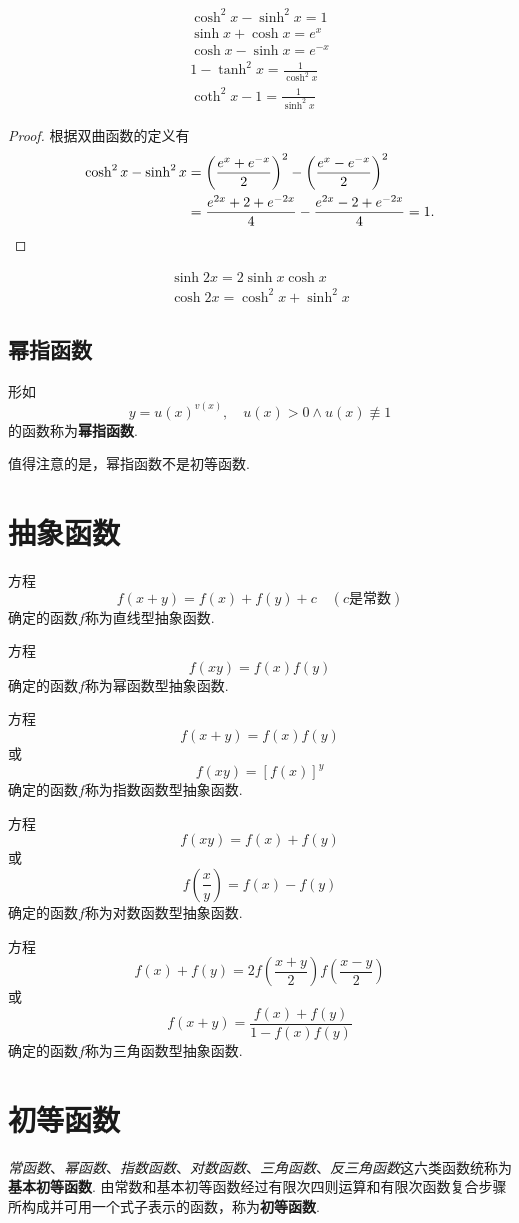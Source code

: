 \begin{theorem}
\begin{gather}
\cosh^2{x} - \sinh^2{x} = 1 \\
\sinh{x} + \cosh{x} = e^x \\
\cosh{x} - \sinh{x} = e^{-x} \\
1 - \tanh^2{x} = \frac{1}{\cosh^2{x}} \\
\coth^2{x} - 1 = \frac{1}{\sinh^2{x}}
\end{gather}
\begin{proof}
根据双曲函数的定义有
\begin{align*}
\cosh^2{x}-\sinh^2{x}
&=\left(\frac{e^x + e^{-x}}{2}\right)^2-\left(\frac{e^x - e^{-x}}{2}\right)^2 \\
&=\frac{e^{2x}+2+e^{-2x}}{4}-\frac{e^{2x}-2+e^{-2x}}{4}
=1. \qedhere
\end{align*}
\end{proof}
\end{theorem}

\begin{theorem}
\begin{gather}
\sinh{2x} = 2 \sinh{x}\cosh{x} \\
\cosh{2x} = \cosh^2{x} + \sinh^2{x}
\end{gather}
\end{theorem}

\subsection{幂指函数}
\begin{definition}
形如\[
y = u(x)^{v(x)},
\quad u(x) > 0 \land u(x) \not\equiv 1
\]的函数称为\textbf{幂指函数}.
\end{definition}
值得注意的是，幂指函数不是初等函数.

\section{抽象函数}
方程\[
f(x+y) = f(x) + f(y) + c \quad(c\text{是常数})
\]确定的函数\(f\)称为直线型抽象函数.

方程\[
f(xy) = f(x) f(y)
\]确定的函数\(f\)称为幂函数型抽象函数.

方程\[
f(x+y) = f(x) f(y)
\]或\[
f(xy) = [f(x)]^y
\]确定的函数\(f\)称为指数函数型抽象函数.

方程\[
f(xy) = f(x) + f(y)
\]或\[
f\left(\frac{x}{y}\right) = f(x) - f(y)
\]确定的函数\(f\)称为对数函数型抽象函数.

方程\[
f(x) + f(y) = 2 f\left(\frac{x+y}{2}\right) f\left(\frac{x-y}{2}\right)
\]或\[
f(x+y) = \frac{f(x) + f(y)}{1 - f(x) f(y)}
\]确定的函数\(f\)称为三角函数型抽象函数.

\section{初等函数}
\begin{definition}
\emph{常函数}、\emph{幂函数}、\emph{指数函数}、\emph{对数函数}、\emph{三角函数}、\emph{反三角函数}这六类函数统称为\textbf{基本初等函数}.
由常数和基本初等函数经过有限次四则运算和有限次函数复合步骤所构成并可用一个式子表示的函数，称为\textbf{初等函数}.
\end{definition}
